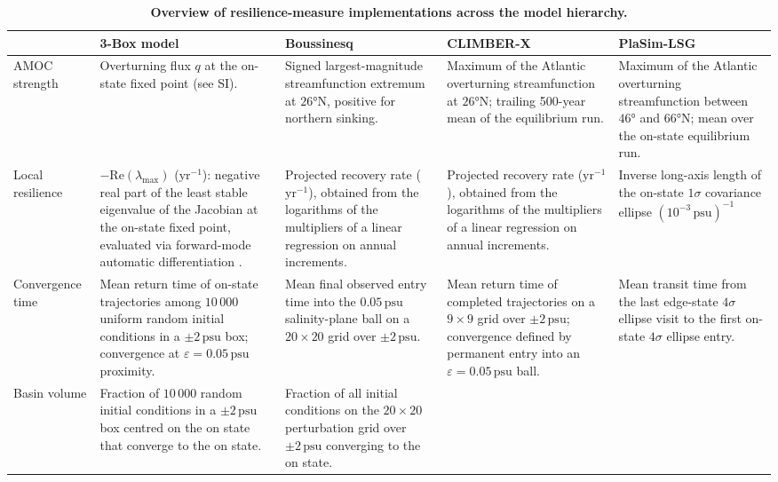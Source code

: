 \documentclass[12pt, a4paper]{article}
\newcommand{\psu}{\,\text{psu}}
\begin{document}
\begin{table}
  \centering
  \small
  \setlength{\tabcolsep}{4pt}
  \caption{\textbf{Overview of resilience-measure implementations across the model hierarchy.}}
  \label{tab:overview}

  \begin{tabular}{p{2.3cm} p{4.5cm} p{4.5cm} p{4.5cm} p{4.5cm}}
    \toprule
    & \textbf{3-Box model} & \textbf{Boussinesq} & \textbf{CLIMBER-X} & \textbf{PlaSim-LSG} \\
    \midrule
    AMOC strength
      & Overturning flux $q$ at the on-state fixed point (see SI).
      & Signed largest-magnitude streamfunction extremum at $26°\text{N}$, positive for northern sinking.
      & Maximum of the Atlantic overturning streamfunction at $26°\text{N}$; trailing 500-year mean of the equilibrium run.
      & Maximum of the Atlantic overturning streamfunction between $46°$ and $66°\text{N}$; mean over the on-state equilibrium run.\\[6pt]
    Local \,\,\,\,\,\,\,\,\,\,\,\,\,\,\,\, resilience
      & $-\mathrm{Re}(\lambda_{\max})$ ($\mathrm{yr}^{-1}$): negative real part of the least stable eigenvalue of the Jacobian at the on-state fixed point, evaluated via forward-mode automatic differentiation \citep{Khan2015VectorForwardMode}.
      & Projected recovery rate ($\mathrm{yr}^{-1}$), obtained from the logarithms of the multipliers of a linear regression on annual increments.
      & Projected recovery rate ($\mathrm{yr}^{-1}$), obtained from the logarithms of the multipliers of a linear regression on annual increments.
      & Inverse long-axis length of the on-state $1\sigma$ covariance ellipse $(10^{-3}\,\mathrm{psu})^{-1}$\\[6pt]
    Convergence time
      & Mean return time of on-state trajectories among $10\,000$ uniform random initial conditions in a $\pm 2\psu{}$ box; convergence at $\varepsilon=0.05\psu{}$ proximity.
      & Mean final observed entry time into the $0.05\psu{}$ salinity-plane ball on a $20\times20$ grid over $\pm2\psu{}$.
      & Mean return time of completed trajectories on a $9\times9$ grid over $\pm 2\psu{}$; convergence defined by permanent entry into an $\varepsilon=0.05\psu{}$ ball.
      & Mean transit time from the last edge-state $4\sigma$ ellipse visit to the first on-state $4\sigma$ ellipse entry. \\[6pt]
    Basin volume
      & Fraction of $10\,000$ random initial conditions in a $\pm 2\psu{}$ box centred on the on state that converge to the on state.
      & Fraction of all initial conditions on the $20\times20$ perturbation grid over $\pm 2\psu{}$ converging to the on state.

\end{tabular}
\end{table}
\end{document}
